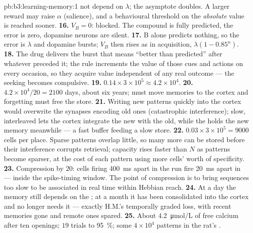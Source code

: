 \begin{solution}{pb:b3:learning-memory:1}
not depend on $\lambda$; the asymptote doubles. A larger reward may
raise $\alpha$ (salience), and a behavioural threshold on the
\emph{absolute} value is reached sooner.
\textbf{16.} $V_{B} = 0$: blocked. The compound is fully predicted, the
error is zero, dopamine neurons are silent.
\textbf{17.} B alone predicts nothing, so the error is $\lambda$ and
dopamine bursts; $V_{B}$ then rises as in acquisition, $\lambda(1 -
0.85^{n})$.
\textbf{18.} The drug delivers the burst that means ``better than
predicted'' after whatever preceded it; the rule increments the value
of those cues and actions on every occasion, so they acquire value
independent of any real outcome --- the seeking becomes compulsive.
\textbf{19.} $0.14\times 3\times 10^{5} \approx 4.2\times 10^{4}$.
\textbf{20.} $4.2\times 10^{4}/20 = 2100$ days, about six years;
 must move memories to the cortex and forgetting must
free the store.
\textbf{21.} Writing new patterns quickly into the cortex would overwrite
the synapses encoding old ones (catastrophic interference); slow,
interleaved  lets the cortex integrate the new with the old,
while the  holds the new memory meanwhile --- a fast buffer
feeding a slow store.
\textbf{22.} $0.03\times 3\times 10^{5} = 9000$ cells per place. Sparse
patterns overlap little, so many more can be stored before their
interference corrupts retrieval; capacity rises faster than $N$ as
patterns become sparser, at the cost of each pattern using more cells'
worth of specificity.
\textbf{23.} Compression by $20$: cells firing \qty{400}{ms} apart in the
run fire \qty{20}{ms} apart in  --- inside the spike-timing
window. The point of compression is to bring sequences too slow to be
associated in real time within Hebbian reach.
\textbf{24.} At a day the memory still depends on the ; at a
month it has been consolidated into the cortex and no longer needs it
--- exactly H.M.'s temporally graded loss, with recent memories gone and
remote ones spared.
\textbf{25.} About \qty{4.2}{\micro mol/L} of free calcium after ten
openings; $19$ trials to \qty{95}{\%}; some $4\times 10^{4}$ patterns
in the rat's .
\end{solution}
